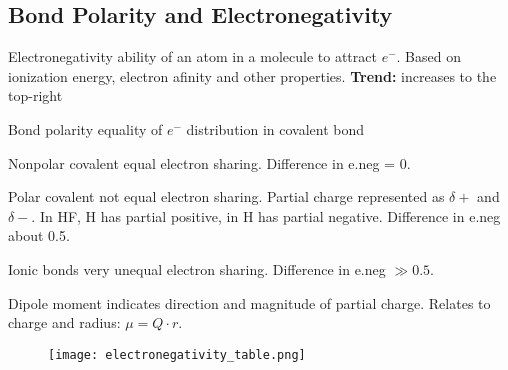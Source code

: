 \begin{mdframed}
\subsection{Bond Polarity and Electronegativity}
\begin{multicols}{2}
\begin{compactdesc}
\item[Electronegativity] ability of an atom in a molecule to attract $e^-$.
    Based on ionization energy, electron afinity and other properties.
    \textbf{Trend:} increases to the top-right
\item[Bond polarity] equality of $e^-$ distribution in covalent bond
\item[Nonpolar covalent] equal electron sharing. Difference in
    e.neg = 0.
\item[Polar covalent] not equal electron sharing. Partial charge represented
    as $\delta +$ and $\delta -$. In HF, H has partial positive, in 
    H has partial negative. Difference in e.neg about 0.5.
\item[Ionic bonds] very unequal electron sharing. Difference in e.neg $\gg 0.5$.
\item[Dipole moment] indicates direction and magnitude of partial charge.
    Relates to charge and radius: $\mu = Q \cdot r$.
\end{compactdesc}

\begin{figure}[H]
    \centering
    \texttt{[image: electronegativity\_table.png]}
\end{figure}
\end{multicols}
\end{mdframed}

